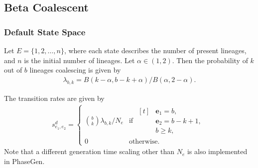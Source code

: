 
\subsection{Beta Coalescent}\label{subsec:beta-coalescent}

\subsubsection{Default State Space}\label{subsubsec:beta_coalescent_default}
Let $E=\{1,2,\ldots,n\}$, where each state describes the number of present lineages, and $n$ is the initial number of lineages.
Let $\alpha \in (1, 2)$.
Then the probability of $k$ out of $b$ lineages coalescing is given by~\citep{beta_coalescent}
\begin{align*}
    \lambda_{b,k} = B(k - \alpha, b - k + \alpha) / B(\alpha, 2 - \alpha).
\end{align*}

The transition rates are given by
\begin{align*}
    s^d_{e_1,e_2} =
    \begin{cases}
        \binom{b}{k} \lambda_{b,k} / N_e & \text{if }
        \begin{aligned}[t]
            & \mathbf{e}_1=b, \\
            & \mathbf{e}_2=b - k + 1, \\
            & b \geq k,
        \end{aligned} \\
        0 & \text{otherwise.}
    \end{cases}
\end{align*}
Note that a different generation time scaling other than $N_e$ is also implemented in PhaseGen.

